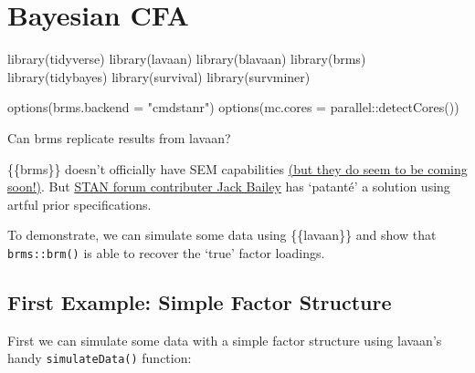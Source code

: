 \documentclass[
  letterpaper,
  DIV=11,
  numbers=noendperiod]{scrreprt}
\newenvironment{Shaded}{\begin{snugshade}}{\end{snugshade}}
\newcommand{\AttributeTok}[1]{\textcolor[rgb]{0.40,0.45,0.13}{#1}}
\newcommand{\FunctionTok}[1]{\textcolor[rgb]{0.28,0.35,0.67}{#1}}
\newcommand{\NormalTok}[1]{\textcolor[rgb]{0.00,0.23,0.31}{#1}}
\newcommand{\SpecialCharTok}[1]{\textcolor[rgb]{0.37,0.37,0.37}{#1}}
\newcommand{\StringTok}[1]{\textcolor[rgb]{0.13,0.47,0.30}{#1}}
\begin{document}
\hypertarget{bayesian-cfa}{%
\chapter{Bayesian CFA}\label{bayesian-cfa}}

\begin{Shaded}
\begin{Highlighting}[]
\FunctionTok{library}\NormalTok{(tidyverse)}
\FunctionTok{library}\NormalTok{(lavaan)}
\FunctionTok{library}\NormalTok{(blavaan)}
\FunctionTok{library}\NormalTok{(brms)}
\FunctionTok{library}\NormalTok{(tidybayes)}
\FunctionTok{library}\NormalTok{(survival)}
\FunctionTok{library}\NormalTok{(survminer)}

\FunctionTok{options}\NormalTok{(}\AttributeTok{brms.backend =} \StringTok{"cmdstanr"}\NormalTok{)}
\FunctionTok{options}\NormalTok{(}\AttributeTok{mc.cores =}\NormalTok{ parallel}\SpecialCharTok{::}\FunctionTok{detectCores}\NormalTok{())}
\end{Highlighting}
\end{Shaded}

Can brms replicate results from lavaan?

\{\{brms\}\} doesn't officially have SEM capabilities
\href{https://github.com/paul-buerkner/brms/issues/304}{(but they do
seem to be coming soon!)}. But
\href{https://discourse.mc-stan.org/t/confirmatory-factor-analysis-using-brms/23139}{STAN
forum contributer Jack Bailey} has `patanté' a solution using artful
prior specifications.

To demonstrate, we can simulate some data using \{\{lavaan\}\} and show
that \texttt{brms::brm()} is able to recover the `true' factor loadings.

\hypertarget{first-example-simple-factor-structure}{%
\section{First Example: Simple Factor
Structure}\label{first-example-simple-factor-structure}}

First we can simulate some data with a simple factor structure using
lavaan's handy \texttt{simulateData()} function:
\end{document}
